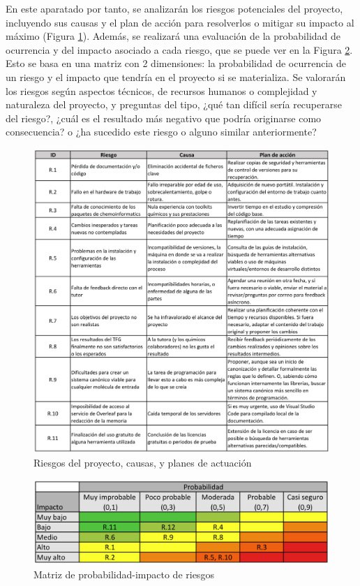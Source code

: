En este aparatado por tanto, se analizarán los riesgos potenciales del proyecto, incluyendo sus causas y el plan de acción para resolverlos o mitigar su impacto al máximo (Figura \ref{tabla:tabla_riesgos}). Además, se realizará una evaluación de la probabilidad de ocurrencia y del impacto asociado a cada riesgo, que se puede ver en la Figura \ref{tabla:riesgos_matriz_probabilidad}. Esto se basa en una matriz con 2 dimensiones: la probabilidad de ocurrencia de un riesgo y el impacto que tendría en el proyecto si se materializa. Se valorarán los riesgos según aspectos técnicos, de recursos humanos o complejidad y naturaleza del proyecto, y preguntas del tipo, ¿qué tan difícil sería recuperarse del riesgo?, ¿cuál es el resultado más negativo que podría originarse como consecuencia? o ¿ha sucedido este riesgo o alguno similar anteriormente?

\begin{figure}
    \centering
    \includegraphics[scale=1]{imagenes/planificacion/riesgos-1_cropped.png}
    \caption{Riesgos del proyecto, causas, y planes de actuación}
    \label{tabla:tabla_riesgos}
\end{figure}

\begin{figure}
    \centering
    \includegraphics[scale=0.95]{imagenes/planificacion/matriz_riesgos.png}
    \caption{Matriz de probabilidad-impacto de riesgos}
    \label{tabla:riesgos_matriz_probabilidad}
\end{figure}


